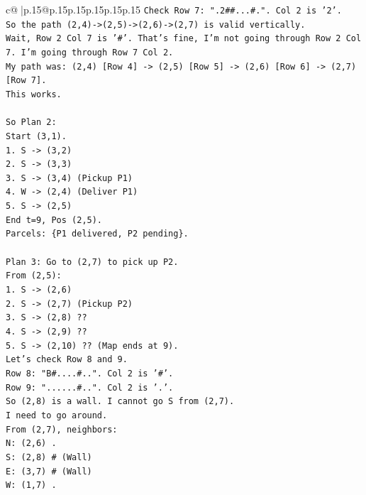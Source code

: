\documentclass{article}
\begin{document}
{\begin{supertabular}{c@{$\;$}|p{.15\linewidth}@{}p{.15\linewidth}p{.15\linewidth}p{.15\linewidth}p{.15\linewidth}p{.15\linewidth}}
{{{\texttt{Check Row 7: ".2\#\#...\#.". Col 2 is '2'.} \\
\texttt{So the path (2,4){-}>(2,5){-}>(2,6){-}>(2,7) is valid vertically.} \\
\texttt{Wait, Row 2 Col 7 is '\#'. That's fine, I'm not going through Row 2 Col 7. I'm going through Row 7 Col 2.} \\
\texttt{My path was: (2,4) {[}Row 4{]} {-}> (2,5) {[}Row 5{]} {-}> (2,6) {[}Row 6{]} {-}> (2,7) {[}Row 7{]}.} \\
\texttt{This works.} \\
\\ 
\texttt{So Plan 2:} \\
\texttt{Start (3,1).} \\
\texttt{1. S {-}> (3,2)} \\
\texttt{2. S {-}> (3,3)} \\
\texttt{3. S {-}> (3,4) (Pickup P1)} \\
\texttt{4. W {-}> (2,4) (Deliver P1)} \\
\texttt{5. S {-}> (2,5)} \\
\texttt{End t=9, Pos (2,5).} \\
\texttt{Parcels: \{P1 delivered, P2 pending\}.} \\
\\ 
\texttt{Plan 3: Go to (2,7) to pick up P2.} \\
\texttt{From (2,5):} \\
\texttt{1. S {-}> (2,6)} \\
\texttt{2. S {-}> (2,7) (Pickup P2)} \\
\texttt{3. S {-}> (2,8) ??} \\
\texttt{4. S {-}> (2,9) ??} \\
\texttt{5. S {-}> (2,10) ?? (Map ends at 9).} \\
\texttt{Let's check Row 8 and 9.} \\
\texttt{Row 8: "B\#....\#..". Col 2 is '\#'.} \\
\texttt{Row 9: "......\#..". Col 2 is '.'.} \\
\texttt{So (2,8) is a wall. I cannot go S from (2,7).} \\
\texttt{I need to go around.} \\
\texttt{From (2,7), neighbors:} \\
\texttt{N: (2,6) .} \\
\texttt{S: (2,8) \# (Wall)} \\
\texttt{E: (3,7) \# (Wall)} \\
\texttt{W: (1,7) .} \\
}}}
\end{supertabular}}
\end{document}

